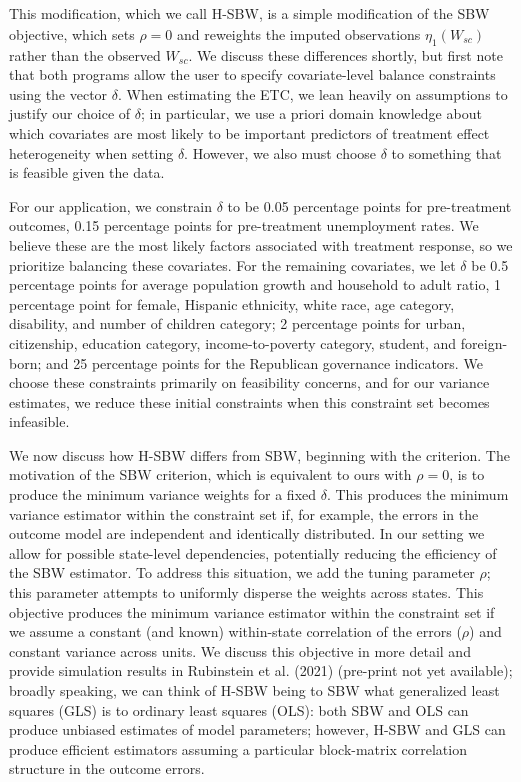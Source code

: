 \documentclass[aoas]{imsart}
\theoremstyle{plain}
\theoremstyle{remark}
\begin{document}
This modification, which we call H-SBW, is a simple modification of the SBW objective, which sets $\rho = 0$ and reweights the imputed observations $\hat{\eta_1(W_{sc})}$ rather than the observed $W_{sc}$. We discuss these differences shortly, but first note that both programs allow the user to specify covariate-level balance constraints using the vector $\delta$. When estimating the ETC, we lean heavily on assumptions to justify our choice of $\delta$; in particular, we use a priori domain knowledge about which covariates are most likely to be important predictors of treatment effect heterogeneity when setting $\delta$. However, we also must choose $\delta$ to something that is feasible given the data. 

For our application, we constrain $\delta$ to be 0.05 percentage points for pre-treatment outcomes, 0.15 percentage points for pre-treatment unemployment rates. We believe these are the most likely factors associated with treatment response, so we prioritize balancing these covariates. For the remaining covariates, we let $\delta$ be 0.5 percentage points for average population growth and household to adult ratio, 1 percentage point for female, Hispanic ethnicity, white race, age category, disability, and number of children category; 2 percentage points for urban, citizenship, education category, income-to-poverty category, student, and foreign-born; and 25 percentage points for the Republican governance indicators. We choose these constraints primarily on feasibility concerns, and for our variance estimates, we reduce these initial constraints when this constraint set becomes infeasible.

We now discuss how H-SBW differs from SBW, beginning with the criterion. The motivation of the SBW criterion, which is equivalent to ours with $\rho = 0$, is to produce the minimum variance weights for a fixed $\delta$. This produces the minimum variance estimator within the constraint set if, for example, the errors in the outcome model are independent and identically distributed. In our setting we allow for possible state-level dependencies, potentially reducing the efficiency of the SBW estimator. To address this situation, we add the tuning parameter $\rho$; this parameter attempts to uniformly disperse the weights across states. This objective produces the minimum variance estimator within the constraint set if we assume a constant (and known) within-state correlation of the errors ($\rho$) and constant variance across units. We discuss this objective in more detail and provide simulation results in Rubinstein et al. (2021) (pre-print not yet available); broadly speaking, we can think of H-SBW being to SBW what generalized least squares (GLS) is to ordinary least squares (OLS): both SBW and OLS can produce unbiased estimates of model parameters; however, H-SBW and GLS can produce efficient estimators assuming a particular block-matrix correlation structure in the outcome errors. 
\end{document}
